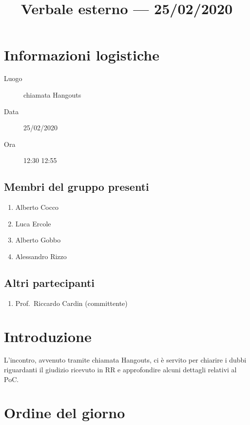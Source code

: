 \documentclass{article}
\title{Verbale esterno --- 25/02/2020}
\begin{document}


\section{Informazioni logistiche}%
\label{sec:informazioni_logistiche}

\begin{description}
  \item [Luogo] chiamata Hangouts
  \item [Data] 25/02/2020
  \item [Ora] 12:30  12:55
\end{description}

\subsection{Membri del gruppo presenti}%
\label{sub:membri_del_gruppo_presenti}

\begin{enumerate}
  \item Alberto Cocco
  \item Luca Ercole
  \item Alberto Gobbo
  \item Alessandro Rizzo
\end{enumerate}

\subsection{Altri partecipanti}%
\label{sub:altri_partecipanti}

\begin{enumerate}
  \item Prof.\ Riccardo Cardin (committente)
\end{enumerate}


\section{Introduzione}%
\label{sec:introduzione}

L'incontro, avvenuto tramite chiamata Hangouts, ci è servito per chiarire i dubbi riguardanti il giudizio ricevuto in RR e approfondire alcuni dettagli relativi al PoC.

\section{Ordine del giorno}%
\label{sec:ordine_del_giorno}
\end{document}

